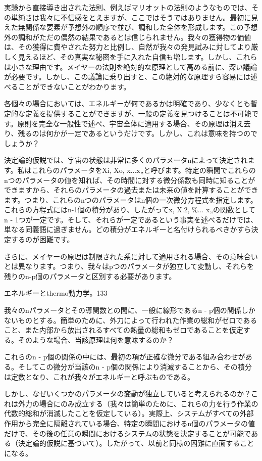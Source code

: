 \documentclass[a4paper,11pt,openany]{ltjsbook}
\begin{document}
実験から直接導き出された法則、例えばマリオットの法則のようなものでは、その単純さは我々に不信感をとえますが、ここではそうではありません。最初に見えた無関係な要素が予想外の順序で並び、調和した全体を形成します。この予想外の調和がただの偶然の結果であるとは信じられません。我々の獲得物の価値は、その獲得に費やされた努力と比例し、自然が我々の発見試みに対してより厳しく見えるほど、その真実な秘密を手に入れた自信も増します。しかし、これらは小さな理由です。メイヤーの法則を絶対的な原理として高める前に、深い議論が必要です。しかし、この議論に乗り出すと、この絶対的な原理すら容易には述べることができないことがわかります。

各個々の場合においては、エネルギーが何であるかは明確であり、少なくとも暫定的な定義を提供することができますが、一般の定義を見つけることは不可能です。原則を完全な一般性で述べ、宇宙全体に適用する場合、その原理は消え去り、残るのは何かが一定であるというだけです。しかし、これは意味を持つのでしょうか？

決定論的仮説では、宇宙の状態は非常に多くのパラメータnによって決定されます。私はこれらのパラメータをXi, Xo, x...x„と呼びます。特定の瞬間でこれらのnつのパラメータの値を知れば、その時間に対する微分係数も同時に知ることができますから、それらのパラメータの過去または未来の値を計算することができます。つまり、これらのnつのパラメータはn個の一次微分方程式を指定します。これらの方程式にはn-1個の積分があり、したがってx, X.2, \%... x„の関数としてn - 1つが一定です。そして、それらが一定であるという事実を述べるだけでは、単なる同義語に過ぎません。どの積分がエネルギーと名付けられるべきかすら決定するのが困難です。

さらに、メイヤーの原理は制限された系に対して適用される場合、その意味合いとは異なります。つまり、我々はpつのパラメータが独立して変動し、それらを残りのn-p個のパラメータと区別する必要があります。

エネルギーとthermo動力学。133

我々のnパラメータとその導関数との間に、一般に線形であるn - p個の関係しかないものとする。簡単のために、外力によって行われた作業の総和がゼロであること、また内部から放出されるすべての熱量の総和もゼロであることを仮定する。そのような場合、当該原理は何を意味するのか？

これらのn - p個の関係の中には、最初の項が正確な微分である組み合わせがある。そしてこの微分が当該のn - p個の関係により消滅することから、その積分は定数となり、これが我々がエネルギーと呼ぶものである。

しかし、なぜいくつかのパラメータの変動が独立していると考えられるのか？これは外力の場合にのみ成立する（我々は簡単のために、これらの力を行う作業の代数的総和が消滅したことを仮定している）。実際上、システムがすべての外部作用から完全に隔離されている場合、特定の瞬間におけるn個のパラメータの値だけで、その後の任意の瞬間におけるシステムの状態を決定することが可能である（決定論的仮説に基づいて）。したがって、以前と同様の困難に直面することになる。
\end{document}
